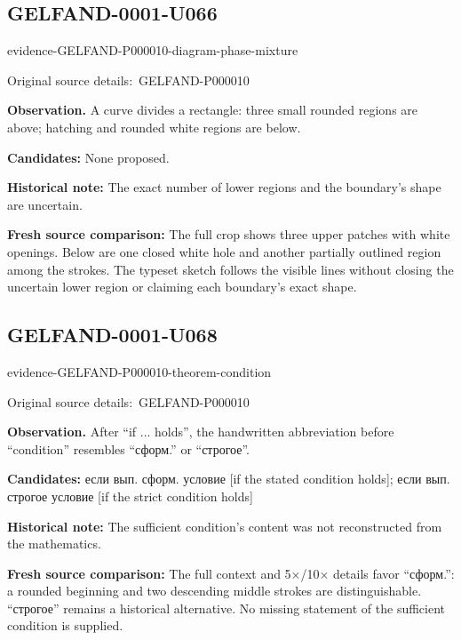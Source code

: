 \documentclass[11pt]{article}
\newcommand{\EvidenceBlock}[4]{%
 \par\smallskip\noindent\begin{minipage}{\linewidth}
 \begin{minipage}[t]{.47\linewidth}\vspace{0pt}\centering
 \csname evidence-#1-#2\endcsname\par
 {\scriptsize\SourceCropCaption\ #1}\par
 \end{minipage}\hfill
 \begin{minipage}[t]{.49\linewidth}\vspace{0pt}\raggedright
 {\small\color{orange!65!black}\textbf{#4} #3}\par
 \end{minipage}
 \end{minipage}\par\smallskip}
\newcommand{\SourceCropCaption}{Original source details:}\newcommand{\ReadingCaption}{Uncertain reading.}\newcommand{\IncompleteCaption}{Undeciphered passage.}\newcommand{\DiagramCaption}{Diagram and typed description.}
\begin{document}
\subsection*{GELFAND-0001-U066}
\EvidenceBlock{GELFAND-P000010}{diagram-phase-mixture}{A curve divides a rectangle: three small rounded regions are above; hatching and rounded white regions are below.}{Observation.}
\par\smallskip\noindent\textbf{Candidates: } None proposed.\par
\par\smallskip\noindent\textbf{Historical note: } The exact number of lower regions and the boundary’s shape are uncertain.\par
\par\smallskip\noindent\textbf{Fresh source comparison: } The full crop shows three upper patches with white openings. Below are one closed white hole and another partially outlined region among the strokes. The typeset sketch follows the visible lines without closing the uncertain lower region or claiming each boundary’s exact shape.\par

\subsection*{GELFAND-0001-U068}
\EvidenceBlock{GELFAND-P000010}{theorem-condition}{After “if ... holds”, the handwritten abbreviation before “condition” resembles “сформ.” or “строгое”.}{Observation.}
\par\smallskip\noindent\textbf{Candidates: } если вып. сформ. условие [if the stated condition holds]; если вып. строгое условие [if the strict condition holds]\par
\par\smallskip\noindent\textbf{Historical note: } The sufficient condition’s content was not reconstructed from the mathematics.\par
\par\smallskip\noindent\textbf{Fresh source comparison: } The full context and 5×/10× details favor “сформ.”: a rounded beginning and two descending middle strokes are distinguishable. “строгое” remains a historical alternative. No missing statement of the sufficient condition is supplied.\par
\end{document}

